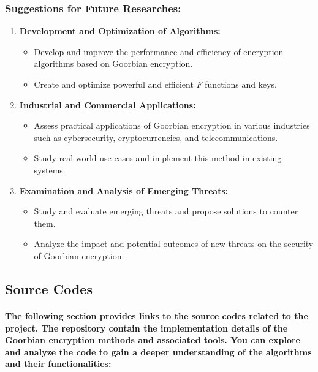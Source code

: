 \documentclass[oneside]{book}
\newcommand{\myparagraph}[1]{\paragraph{\textnormal{#1}}}
\begin{document}
\subsubsection*{Suggestions for Future Researches:}

\begin{enumerate}
\item \textbf{Development and Optimization of Algorithms:}
\begin{itemize}
\item Develop and improve the performance and efficiency of encryption algorithms based on Goorbian encryption.
\item Create and optimize powerful and efficient $F$ functions and keys.
\end{itemize}
\item \textbf{Industrial and Commercial Applications:}
\begin{itemize} 
\item Assess practical applications of Goorbian encryption in various industries such as cybersecurity, cryptocurrencies, and telecommunications. 
\item Study real-world use cases and implement this method in existing systems.
\end{itemize}
\item \textbf{Examination and Analysis of Emerging Threats:}
\begin{itemize}
\item Study and evaluate emerging threats and propose solutions to counter them.
\item Analyze the impact and potential outcomes of new threats on the security of Goorbian encryption.
\end{itemize}
\end{enumerate}

\newpage

\label{subsec:codes}
\subsection{Source Codes}

\myparagraph{
The following section provides links to the source codes related to the project. The repository contain the implementation details of the \textbf{Goorbian encryption} methods and associated tools. You can explore and analyze the code to gain a deeper understanding of the algorithms and their functionalities:
}
\end{document}
